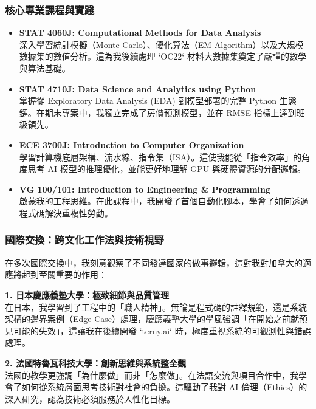 \documentclass[12pt,a4paper]{article}
\begin{document}
\subsubsection{核心專業課程與實踐}
\begin{itemize}
    \item \textbf{STAT 4060J: Computational Methods for Data Analysis} \\
    深入學習統計模擬（Monte Carlo）、優化算法（EM Algorithm）以及大規模數據集的數值分析。這為我後續處理 `OC22` 材料大數據集奠定了嚴謹的數學與算法基礎。
    \item \textbf{STAT 4710J: Data Science and Analytics using Python} \\
    掌握從 Exploratory Data Analysis (EDA) 到模型部署的完整 Python 生態鏈。在期末專案中，我獨立完成了房價預測模型，並在 RMSE 指標上達到班級領先。
    \item \textbf{ECE 3700J: Introduction to Computer Organization} \\
    學習計算機底層架構、流水線、指令集（ISA）。這使我能從「指令效率」的角度思考 AI 模型的推理優化，並能更好地理解 GPU 與硬體資源的分配邏輯。
    \item \textbf{VG 100/101: Introduction to Engineering \& Programming} \\
    啟蒙我的工程思維。在此課程中，我開發了首個自動化腳本，學會了如何透過程式碼解決重複性勞動。
\end{itemize}

\newpage

\subsubsection{國際交換：跨文化工作法與技術視野}

在多次國際交換中，我刻意觀察了不同發達國家的做事邏輯，這對我對加拿大的適應將起到至關重要的作用：

\textbf{1. 日本慶應義塾大學：極致細節與品質管理} \\
在日本，我學習到了工程中的「職人精神」。無論是程式碼的註釋規範，還是系統架構的邊界案例（Edge Case）處理，慶應義塾大學的學風強調「在開始之前就預見可能的失效」，這讓我在後續開發 `terny.ai` 時，極度重視系統的可觀測性與錯誤處理。

\textbf{2. 法國特魯瓦科技大學：創新思維與系統整全觀} \\
法國的教學更強調「為什麼做」而非「怎麼做」。在法語交流與項目合作中，我學會了如何從系統層面思考技術對社會的負擔。這驅動了我對 AI 倫理（Ethics）的深入研究，認為技術必須服務於人性化目標。
\end{document}
